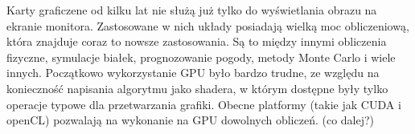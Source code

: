

Karty graficzene od kilku lat nie służą już tylko do wyświetlania obrazu na ekranie monitora. Zastosowane w nich układy posiadają wielką moc obliczeniową, która znajduje coraz to nowsze zastosowania. Są to między innymi obliczenia fizyczne, symulacje białek, prognozowanie pogody, metody Monte Carlo i wiele innych. Początkowo wykorzystanie GPU było bardzo trudne, ze względu na konieczność napisania algorytmu jako shadera, w którym dostępne były tylko operacje typowe dla przetwarzania grafiki. Obecne platformy (takie jak CUDA i openCL) pozwalają na wykonanie na GPU dowolnych obliczeń. 
\linebreak
(co dalej?)
